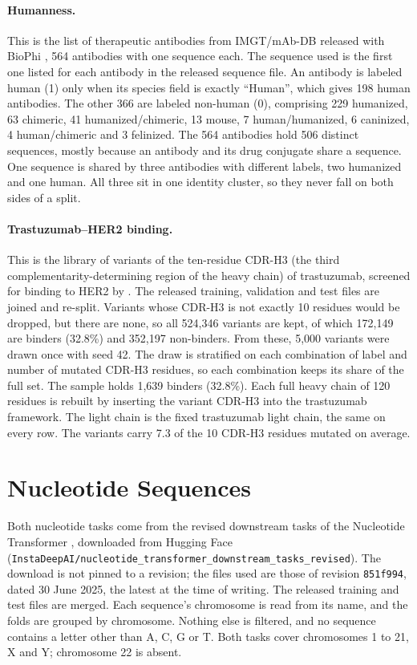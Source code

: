\paragraph{Humanness.} This is the list of therapeutic antibodies from IMGT/mAb-DB released with BioPhi \citep{Prihoda2022}, 564 antibodies with one sequence each. The sequence used is the first one listed for each antibody in the released sequence file. An antibody is labeled human (1) only when its species field is exactly ``Human'', which gives 198 human antibodies. The other 366 are labeled non-human (0), comprising 229 humanized, 63 chimeric, 41 humanized/chimeric, 13 mouse, 7 human/humanized, 6 caninized, 4 human/chimeric and 3 felinized. The 564 antibodies hold 506 distinct sequences, mostly because an antibody and its drug conjugate share a sequence. One sequence is shared by three antibodies with different labels, two humanized and one human. All three sit in one identity cluster, so they never fall on both sides of a split.

\paragraph{Trastuzumab--HER2 binding.} This is the library of variants of the ten-residue CDR-H3 (the third complementarity-determining region of the heavy chain) of trastuzumab, screened for binding to HER2 by \citet{Chinery2024}. The released training, validation and test files are joined and re-split. Variants whose CDR-H3 is not exactly 10 residues would be dropped, but there are none, so all 524,346 variants are kept, of which 172,149 are binders (32.8\%) and 352,197 non-binders. From these, 5,000 variants were drawn once with seed 42. The draw is stratified on each combination of label and number of mutated CDR-H3 residues, so each combination keeps its share of the full set. The sample holds 1,639 binders (32.8\%). Each full heavy chain of 120 residues is rebuilt by inserting the variant CDR-H3 into the trastuzumab framework. The light chain is the fixed trastuzumab light chain, the same on every row. The variants carry 7.3 of the 10 CDR-H3 residues mutated on average.

\section{Nucleotide Sequences}\label{app:datasets:nucleotides}

Both nucleotide tasks come from the revised downstream tasks of the Nucleotide Transformer \citep{DallaTorre2025}, downloaded from Hugging Face (\nolinkurl{InstaDeepAI/nucleotide_transformer_downstream_tasks_revised}). The download is not pinned to a revision; the files used are those of revision \texttt{851f994}, dated 30 June 2025, the latest at the time of writing. The released training and test files are merged. Each sequence's chromosome is read from its name, and the folds are grouped by chromosome. Nothing else is filtered, and no sequence contains a letter other than A, C, G or T. Both tasks cover chromosomes 1 to 21, X and Y; chromosome 22 is absent.

